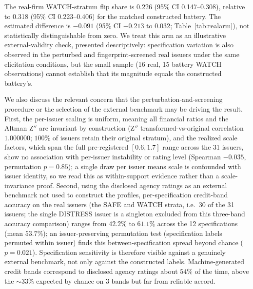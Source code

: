\documentclass[a4paper,fleqn]{cas-sc}
\begin{document}
The real-firm WATCH-stratum flip share is 0.226 (95\% CI 0.147--0.308), relative to 0.318 (95\% CI
0.223--0.406) for the matched constructed battery. The estimated difference is $-0.091$ (95\% CI $-0.213$
to $0.032$; Table~\ref{tab:realarm}), not statistically distinguishable from zero. We treat this arm as an
illustrative external-validity check, presented descriptively: specification variation is also observed
in the perturbed and fingerprint-screened real issuers under the same elicitation conditions, but the small sample (16 real, 15
battery WATCH observations) cannot establish that its magnitude equals the constructed battery's.

We also discuss the relevant concern that the perturbation-and-screening procedure or the selection of the external
benchmark may be driving the result. First, the per-issuer scaling is uniform, meaning all financial
ratios and the Altman Z$''$ are invariant by construction (Z$''$ transformed-vs-original correlation
$1.000000$; $100\%$ of issuers retain their original stratum), and the realized scale factors, which span
the full pre-registered $[0.6,1.7]$ range across the 31 issuers, show no association with per-issuer
instability or rating level (Spearman $-0.035$, permutation $p=0.85$); a single draw per issuer means
scale is confounded with issuer identity, so we read this as within-support evidence rather than a
scale-invariance proof. Second, using the disclosed agency ratings as an external benchmark not used to
construct the profiles, per-specification credit-band accuracy on the real issuers (the SAFE and WATCH
strata, i.e.\ 30 of the 31 issuers; the single DISTRESS issuer is a singleton excluded from this
three-band accuracy comparison) ranges from $42.2\%$
to $61.1\%$ across the 12 specifications (mean $53.7\%$); an issuer-preserving permutation test (specification
labels permuted within issuer) finds this between-specification spread beyond chance ($p=0.021$). Specification
sensitivity is therefore visible against a genuinely external benchmark, not only against the constructed
labels. Machine-generated credit bands correspond to disclosed agency ratings
about $54\%$ of the time, above the $\sim$33\% expected by chance on 3 bands but far from reliable
accord.
\end{document}
